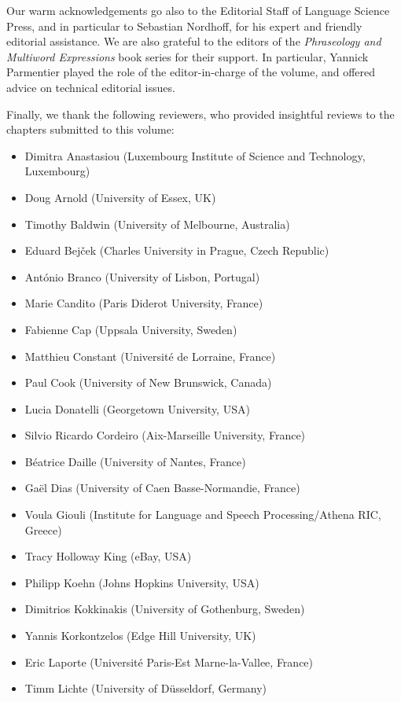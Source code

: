 \documentclass[output=paper,
modfonts,
]{langscibook}
\begin{document}
Our warm acknowledgements go also to the Editorial Staff of Language Science Press, and in particular to Sebastian Nordhoff, for his expert and friendly  editorial assistance. We are also grateful to the editors of the \emph{Phraseology and Multiword Expressions} book series for their support. In particular, Yannick Parmentier played the role of the editor-in-charge of the volume, and offered advice on technical editorial issues.

Finally, we thank the following reviewers, who provided insightful reviews to the chapters submitted to this volume:

\begin{itemize}
\item Dimitra Anastasiou (Luxembourg Institute of Science and Technology, Luxembourg)
\item Doug Arnold (University of Essex, UK)
\item Timothy Baldwin (University of Melbourne, Australia)
\item Eduard Bejček (Charles University in Prague, Czech Republic)
\item António Branco (University of Lisbon, Portugal)
\item Marie Candito (Paris Diderot University, France)
\item Fabienne Cap (Uppsala University, Sweden)
\item Matthieu Constant (Université de Lorraine, France)
\item Paul Cook (University of New Brunswick, Canada)
\item Lucia Donatelli (Georgetown University, USA)
\item Silvio Ricardo Cordeiro (Aix-Marseille University, France)
\item Béatrice Daille (University of Nantes, France)
\item Gaël Dias (University of Caen Basse-Normandie, France)
\item Voula Giouli (Institute for Language and Speech Processing/Athena RIC, Greece)
\item Tracy Holloway King (eBay, USA)
\item Philipp Koehn (Johns Hopkins University, USA)
\item Dimitrios Kokkinakis (University of Gothenburg, Sweden)
\item Yannis Korkontzelos (Edge Hill University, UK)
\item Eric Laporte (Université Paris-Est Marne-la-Vallee, France)
\item Timm Lichte (University of Düsseldorf, Germany)

\end{itemize}
\end{document}
